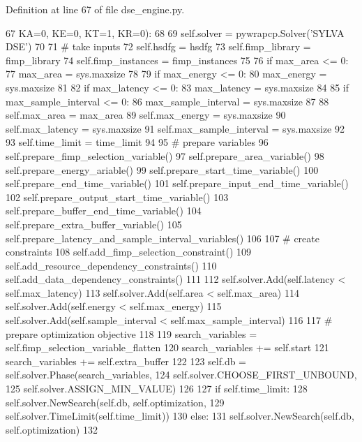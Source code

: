 Definition at line 67 of file dse\+\_\+engine.\+py.


\begin{DoxyCode}
67                  KA=0, KE=0, KT=1, KR=0):
68 
69         self.solver = pywrapcp.Solver(\textcolor{stringliteral}{'SYLVA DSE'})
70 
71         \textcolor{comment}{# take inputs}
72         self.hsdfg = hsdfg
73         self.fimp\_library = fimp\_library
74         self.fimp\_instances = fimp\_instances
75 
76         \textcolor{keywordflow}{if} max\_area <= 0:
77             max\_area = sys.maxsize
78 
79         \textcolor{keywordflow}{if} max\_energy <= 0:
80             max\_energy = sys.maxsize
81 
82         \textcolor{keywordflow}{if} max\_latency <= 0:
83             max\_latency = sys.maxsize
84 
85         \textcolor{keywordflow}{if} max\_sample\_interval <= 0:
86             max\_sample\_interval = sys.maxsize
87 
88         self.max\_area = max\_area
89         self.max\_energy = sys.maxsize
90         self.max\_latency = sys.maxsize
91         self.max\_sample\_interval = sys.maxsize
92 
93         self.time\_limit = time\_limit
94 
95         \textcolor{comment}{# prepare variables}
96         self.prepare\_fimp\_selection\_variable()
97         self.prepare\_area\_variable()
98         self.prepare\_energy\_ariable()
99         self.prepare\_start\_time\_variable()
100         self.prepare\_end\_time\_variable()
101         self.prepare\_input\_end\_time\_variable()
102         self.prepare\_output\_start\_time\_variable()
103         self.prepare\_buffer\_end\_time\_variable()
104         self.prepare\_extra\_buffer\_variable()
105         self.prepare\_latency\_and\_sample\_interval\_variables()
106 
107         \textcolor{comment}{# create constraints}
108         self.add\_fimp\_selection\_constraint()
109         self.add\_resource\_dependency\_constraints()
110         self.add\_data\_dependency\_constraints()
111 
112         self.solver.Add(self.latency < self.max\_latency)
113         self.solver.Add(self.area < self.max\_area)
114         self.solver.Add(self.energy < self.max\_energy)
115         self.solver.Add(self.sample\_interval < self.max\_sample\_interval)
116 
117         \textcolor{comment}{# prepare optimization objective}
118 
119         search\_variables = self.fimp\_selection\_variable\_flatten
120         search\_variables += self.start
121         search\_variables += self.extra\_buffer
122 
123         self.db = self.solver.Phase(search\_variables,
124                                     self.solver.CHOOSE\_FIRST\_UNBOUND,
125                                     self.solver.ASSIGN\_MIN\_VALUE)
126 
127         \textcolor{keywordflow}{if} self.time\_limit:
128             self.solver.NewSearch(self.db, self.optimization,
129                                   self.solver.TimeLimit(self.time\_limit))
130         \textcolor{keywordflow}{else}:
131             self.solver.NewSearch(self.db, self.optimization)
132 
\end{DoxyCode}


